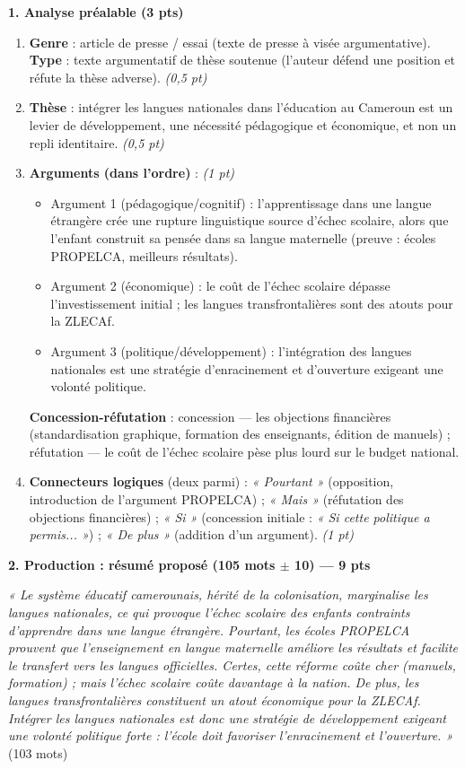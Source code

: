 \documentclass[11pt]{article}
\begin{document}
\begin{corrige}
\textbf{1. Analyse préalable (3 pts)}
\begin{enumerate}
    \item \textbf{Genre} : article de presse / essai (texte de presse à visée argumentative). \textbf{Type} : texte argumentatif de thèse soutenue (l'auteur défend une position et réfute la thèse adverse). \textit{(0,5 pt)}
    \item \textbf{Thèse} : intégrer les langues nationales dans l'éducation au Cameroun est un levier de développement, une nécessité pédagogique et économique, et non un repli identitaire. \textit{(0,5 pt)}
    \item \textbf{Arguments (dans l'ordre)} : \textit{(1 pt)}
    \begin{itemize}
        \item Argument 1 (pédagogique/cognitif) : l'apprentissage dans une langue étrangère crée une rupture linguistique source d'échec scolaire, alors que l'enfant construit sa pensée dans sa langue maternelle (preuve : écoles PROPELCA, meilleurs résultats).
        \item Argument 2 (économique) : le coût de l'échec scolaire dépasse l'investissement initial ; les langues transfrontalières sont des atouts pour la ZLECAf.
        \item Argument 3 (politique/développement) : l'intégration des langues nationales est une stratégie d'enracinement et d'ouverture exigeant une volonté politique.
    \end{itemize}
    \textbf{Concession-réfutation} : concession — les objections financières (standardisation graphique, formation des enseignants, édition de manuels) ; réfutation — le coût de l'échec scolaire pèse plus lourd sur le budget national.
    \item \textbf{Connecteurs logiques} (deux parmi) : \emph{« Pourtant »} (opposition, introduction de l'argument PROPELCA) ; \emph{« Mais »} (réfutation des objections financières) ; \emph{« Si »} (concession initiale : \emph{« Si cette politique a permis... »}) ; \emph{« De plus »} (addition d'un argument). \textit{(1 pt)}
\end{enumerate}

\textbf{2. Production : résumé proposé (105 mots $\pm$ 10) — 9 pts}

\emph{« Le système éducatif camerounais, hérité de la colonisation, marginalise les langues nationales, ce qui provoque l'échec scolaire des enfants contraints d'apprendre dans une langue étrangère. Pourtant, les écoles PROPELCA prouvent que l'enseignement en langue maternelle améliore les résultats et facilite le transfert vers les langues officielles. Certes, cette réforme coûte cher (manuels, formation) ; mais l'échec scolaire coûte davantage à la nation. De plus, les langues transfrontalières constituent un atout économique pour la ZLECAf. Intégrer les langues nationales est donc une stratégie de développement exigeant une volonté politique forte : l'école doit favoriser l'enracinement et l'ouverture. »} (103 mots)


\end{corrige}
\end{document}

